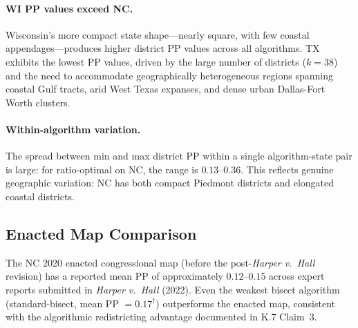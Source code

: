 \paragraph{WI PP values exceed NC.}
Wisconsin's more compact state shape---nearly square, with few coastal appendages---produces
higher district PP values across all algorithms. TX exhibits the lowest PP values,
driven by the large number of districts ($k=38$) and the need to accommodate
geographically heterogeneous regions spanning coastal Gulf tracts, arid West Texas
expanses, and dense urban Dallas-Fort Worth clusters.

\paragraph{Within-algorithm variation.}
The spread between min and max district PP within a single algorithm-state pair
is large: for ratio-optimal on NC, the range is $0.13$--$0.36$.
This reflects genuine geographic variation: NC has both compact Piedmont districts
and elongated coastal districts.

\subsection{Enacted Map Comparison}

The NC 2020 enacted congressional map (before the post-\textit{Harper v.\ Hall}
revision) has a reported mean PP of approximately $0.12$--$0.15$ across expert
reports submitted in \textit{Harper v.\ Hall} (2022).
Even the weakest bisect algorithm (standard-bisect, mean PP $= 0.17^\dagger$)
outperforms the enacted map, consistent with the algorithmic redistricting
advantage documented in K.7 Claim~3.
